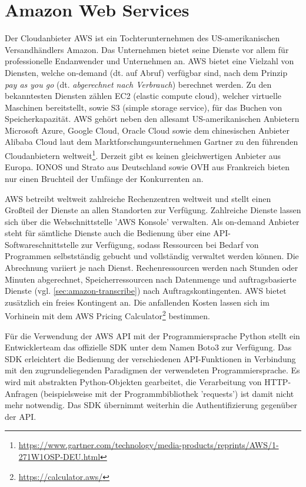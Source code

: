 \section{Amazon Web Services}

Der Cloudanbieter AWS ist ein Tochterunternehmen des US-amerikanischen Versandhändlers Amazon. Das Unternehmen bietet seine Dienste vor allem für professionelle Endanwender und Unternehmen an. AWS bietet eine Vielzahl von Diensten, welche on-demand (dt. auf Abruf) verfügbar sind, nach dem Prinzip \textit{pay as you go} (dt. \textit{abgerechnet nach Verbrauch}) berechnet werden. Zu den bekanntesten Diensten zählen EC2 (elastic compute cloud), welcher virtuelle Maschinen bereitstellt, sowie S3 (simple storage service), für das Buchen von Speicherkapazität. AWS gehört neben den allesamt US-amerikanischen Anbietern Microsoft Azure, Google Cloud, Oracle Cloud sowie dem chinesischen Anbieter Alibaba Cloud laut dem Marktforschungsunternehmen Gartner zu den führenden Cloudanbietern weltweit\footnote{\url{https://www.gartner.com/technology/media-products/reprints/AWS/1-271W1OSP-DEU.html}}. Derzeit gibt es keinen gleichwertigen Anbieter aus Europa. IONOS und Strato aus Deutschland sowie OVH aus Frankreich bieten nur einen Bruchteil der Umfänge der Konkurrenten an.

AWS betreibt weltweit zahlreiche Rechenzentren weltweit und stellt einen Großteil der Dienste an allen Standorten zur Verfügung. Zahlreiche Dienste lassen sich über die Webschnittstelle 'AWS Konsole' verwalten. Als on-demand Anbieter steht für sämtliche Dienste auch die Bedienung über eine API-Softwareschnittstelle zur Verfügung, sodass Ressourcen bei Bedarf von Programmen selbstständig gebucht und vollständig verwaltet werden können. Die Abrechnung variiert je nach Dienst. Rechenressourcen werden nach Stunden oder Minuten abgerechnet, Speicherressourcen nach Datenmenge und auftragsbasierte Dienste (vgl. \autoref{sec:amazon-transcribe}) nach Auftragskontingenten. AWS bietet zusätzlich ein freies Kontingent an. Die anfallenden Kosten lassen sich im Vorhinein mit dem AWS Pricing Calculator\footnote{\url{https://calculator.aws/}} bestimmen. 

Für die Verwendung der AWS API mit der Programmiersprache Python stellt ein Entwicklerteam das offizielle SDK unter dem Namen Boto3 zur Verfügung. Das SDK erleichtert die Bedienung der verschiedenen API-Funktionen in Verbindung mit den zugrundeliegenden Paradigmen der verwendeten Programmiersprache. Es wird mit abstrakten Python-Objekten gearbeitet, die Verarbeitung von HTTP-Anfragen (beispielsweise mit der Programmbibliothek 'requests') ist damit nicht mehr notwendig. Das SDK übernimmt weiterhin die Authentifizierung gegenüber der API.

